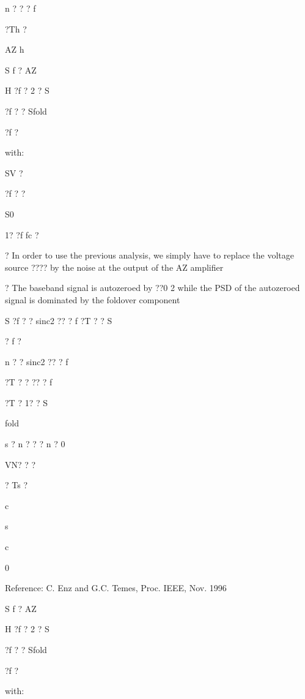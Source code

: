 \documentclass[2pt,landscape]{article}
\begin{document}
\begin{multicols*}{5}
n	?	? ? f


?Th	?


AZ	h






S	f	?
AZ


H ?f ? 2 ? S


?f ? ? Sfold


?f ?






with:


SV ?


?f ? ?


S0

1? ?f fc ?








?	In order to use the previous analysis, we simply have to replace the voltage 
source ????  by the noise at the output of the AZ amplifier



?	The baseband signal is autozeroed by ??0	2 while the PSD of the
autozeroed signal is dominated by the foldover component



S	?f ? ? sinc2 ?? ? f ?T ? ?	S


? f ?


n ? ? sinc2 ?? ? f




?T ? ? ?? ? f


?T ? 1? ? S


fold


s	?
n
?
?
?
n
?
0


VN?  ?
?


?
Ts ?


c

s

c

0



Reference: C. Enz and G.C. Temes, Proc. IEEE, Nov. 1996







S	f	?
AZ


H ?f ? 2 ? S


?f ? ? Sfold


?f ?






with:



\end{multicols*}
\end{document}
